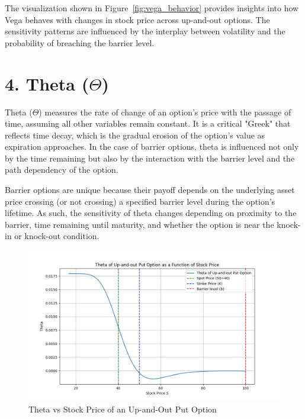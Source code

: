 The visualization shown in Figure~\ref{fig:vega_behavior} provides insights into how Vega behaves with changes in stock price across up-and-out options. The sensitivity patterns are influenced by the interplay between volatility and the probability of breaching the barrier level.

\section{4. Theta (\(\Theta\))}

Theta (\(\Theta\)) measures the rate of change of an option's price with the passage of time, assuming all other variables remain constant. It is a critical "Greek" that reflects time decay, which is the gradual erosion of the option's value as expiration approaches. In the case of barrier options, theta is influenced not only by the time remaining but also by the interaction with the barrier level and the path dependency of the option.

Barrier options are unique because their payoff depends on the underlying asset price crossing (or not crossing) a specified barrier level during the option's lifetime. As such, the sensitivity of theta changes depending on proximity to the barrier, time remaining until maturity, and whether the option is near the knock-in or knock-out condition.

\begin{figure}[H]
    \centering
    \includegraphics[width=.65\linewidth]{content/images/theta_upout.png}
    \caption{Theta vs Stock Price of an Up-and-Out Put Option}
    \label{fig:theta_behavior}
\end{figure}

